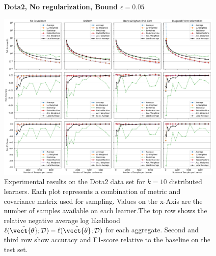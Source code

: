     \begin{landscape}
    \begin{figure}
        \centering
        \textbf{Dota2, No regularization, Bound $\epsilon=0.05$}\par\medskip
        \includegraphics[height=\dimexpr \textheight - 4\baselineskip\relax]{kapitel/figures/dota2_None_0.05_neg_relative.pdf}
        \caption[Dota2 plots without regularization and $\epsilon=0.05$]{Experimental results on the Dota2 data set for $k=10$ distributed learners. Each plot represents a combination of metric and covariance matrix used for sampling. Values on the x-Axis are the number of samples available on each learner.The top row shows the relative negative average log likelihood $\ell(\tilde{\vect{\theta}}; \mathcal{D}) - \ell(\hat{\vect{\theta}}; \mathcal{D})$ for each aggregate. Second and third row show accuracy and F1-score relative to the baseline on the test set.}
        \label{fig:analysis11}
    \end{figure}
    \end{landscape}

